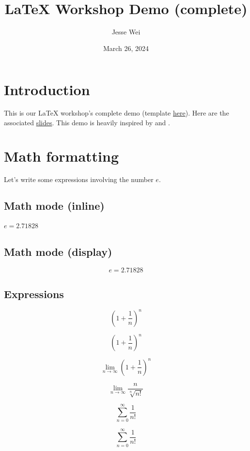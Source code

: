\documentclass{article}
\title{\LaTeX{} Workshop Demo (complete)}
\author{Jesse Wei}
\date{March 26, 2024}
\begin{document}
\maketitle

\tableofcontents
\newpage

\section{Introduction}

This is our \LaTeX{} workshop's complete demo (template \href{https://www.overleaf.com/read/tmgncmqywbdj#3f2451}{here}). Here are the associated \href{https://docs.google.com/presentation/d/1zO6tLPnshC0WfSBvqL2mZKDLLprnuQr2t1IMmsjBdlM/edit?usp=sharing}{slides}. This demo is heavily inspired by \cite{latex_vid_1} and \cite{latex_vid_2}.

\section{Math formatting}

Let's write some expressions involving the number $e$.

\subsection{Math mode (inline)}

$e=2.71828$

\subsection{Math mode (display)}

$$e=2.71828$$

\subsection{Expressions}

$$(1+\frac{1}{n})^n$$

$$\left(1+\frac{1}{n}\right)^n$$

$$\lim_{n\to\infty}\left(1+\frac{1}{n}\right)^n$$

$$\lim_{n\to\infty}\frac{n}{\sqrt[n]{n!}}$$

$$\sum_{n=0}^{\infty}\frac{1}{n!}$$

\begin{equation}
    \label{esum}
    \sum_{n=0}^{\infty}\frac{1}{n!}
\end{equation}
\end{document}
